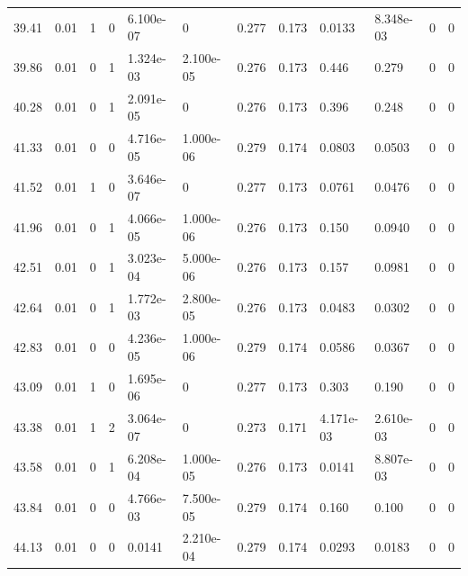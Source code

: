 \documentclass[preview]{standalone}
\begin{document}
{{{\begin{tabular}{L{1.2cm}C{1.2cm} C{0.3cm}C{0.5cm} C{1.4cm}C{1.4cm} C{1.4cm}C{1.4cm} C{1.6cm}C{1.6cm} C{1.6cm}C{1.6cm}}
  39.41  &  0.01  & 1     &  0 &  6.100e-07  & 0  &  0.277&   0.173& 0.0133 & 8.348e-03   &  0 & 0  \\ 
  39.86  &  0.01  & 0     &  1 &  1.324e-03  & 2.100e-05  &  0.276&   0.173& 0.446 & 0.279   &  0 & 0  \\ 
  40.28  &  0.01  & 0     &  1 &  2.091e-05  & 0  &  0.276&   0.173& 0.396 & 0.248   &  0 & 0  \\ 
  41.33  &  0.01  & 0     &  0 &  4.716e-05  & 1.000e-06  &  0.279&   0.174& 0.0803 & 0.0503   &  0 & 0  \\ 
  41.52  &  0.01  & 1     &  0 &  3.646e-07  & 0  &  0.277&   0.173& 0.0761 & 0.0476   &  0 & 0  \\ 
  41.96  &  0.01  & 0     &  1 &  4.066e-05  & 1.000e-06  &  0.276&   0.173& 0.150 & 0.0940   &  0 & 0  \\ 
  42.51  &  0.01  & 0     &  1 &  3.023e-04  & 5.000e-06  &  0.276&   0.173& 0.157 & 0.0981   &  0 & 0  \\ 
  42.64  &  0.01  & 0     &  1 &  1.772e-03  & 2.800e-05  &  0.276&   0.173& 0.0483 & 0.0302   &  0 & 0  \\ 
  42.83  &  0.01  & 0     &  0 &  4.236e-05  & 1.000e-06  &  0.279&   0.174& 0.0586 & 0.0367   &  0 & 0  \\ 
  43.09  &  0.01  & 1     &  0 &  1.695e-06  & 0  &  0.277&   0.173& 0.303 & 0.190   &  0 & 0  \\ 
  43.38  &  0.01  & 1     &  2 &  3.064e-07  & 0  &  0.273&   0.171& 4.171e-03 & 2.610e-03   &  0 & 0  \\ 
  43.58  &  0.01  & 0     &  1 &  6.208e-04  & 1.000e-05  &  0.276&   0.173& 0.0141 & 8.807e-03   &  0 & 0  \\ 
  43.84  &  0.01  & 0     &  0 &  4.766e-03  & 7.500e-05  &  0.279&   0.174& 0.160 & 0.100   &  0 & 0  \\ 
  44.13  &  0.01  & 0     &  0 &  0.0141  & 2.210e-04  &  0.279&   0.174& 0.0293 & 0.0183   &  0 & 0  \\ 
\hline 
\end{tabular} 

}}}
\end{document}
